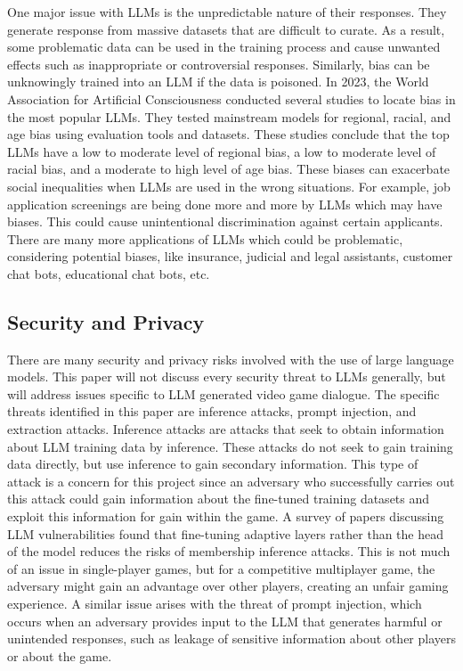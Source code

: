 \documentclass[10pt,twocolumn]{article}
\begin{document}
        \par
        One major issue with LLMs is the unpredictable nature of their responses. They generate response from massive datasets that are difficult to curate. As a result, some problematic data can be used in the training process and cause unwanted effects such as inappropriate or controversial responses. Similarly, bias can be unknowingly trained into an LLM if the data is poisoned\cite{data_poisoning}. In 2023, the World Association for Artificial Consciousness conducted several studies to locate bias in the most popular LLMs. They tested mainstream models for regional, racial, and age bias using evaluation tools and datasets. These studies conclude that the top LLMs have a low to moderate level of regional bias\cite{duan_ranking_nodate}, a low to moderate level of racial bias\cite{duan_large_nodate}, and a moderate to high level of age bias\cite{yucong_duan_large_2024}. These biases can exacerbate social inequalities when LLMs are used in the wrong situations. For example, job application screenings are being done more and more by LLMs which may have biases. This could cause unintentional discrimination against certain applicants. There are many more applications of LLMs which could be problematic, considering potential biases, like insurance, judicial and legal assistants, customer chat bots, educational chat bots, etc. 

    \subsection{Security and Privacy}

        \par 
        There are many security and privacy risks involved with the use of large language models. This paper will not discuss every security threat to LLMs generally, but will address issues specific to LLM generated video game dialogue. The specific threats identified in this paper are inference attacks, prompt injection, and extraction attacks. Inference attacks are attacks that seek to obtain information about LLM training data by inference\cite{model_leeching}. These attacks do not seek to gain training data directly, but use inference to gain secondary information. This type of attack is a concern for this project since an adversary who successfully carries out this attack could gain information about the fine-tuned training datasets and exploit this information for gain within the game. A survey of papers discussing LLM vulnerabilities found that fine-tuning adaptive layers rather than the head of the model reduces the risks of membership inference attacks\cite{llm_security_survey}. This is not much of an issue in single-player games, but for a competitive multiplayer game, the adversary might gain an advantage over other players, creating an unfair gaming experience. A similar issue arises with the threat of prompt injection, which occurs when an adversary provides input to the LLM that generates harmful or unintended responses, such as leakage of sensitive information about other players or about the game\cite{prompt_injection}.
\end{document}
